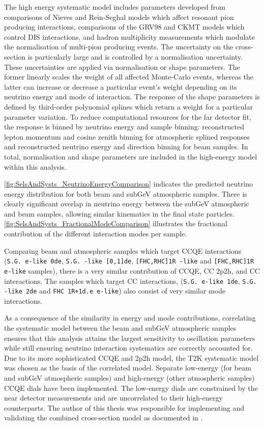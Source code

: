 The high energy systematic model includes parameters developed from comparisons of Nieves and Rein-Seghal models which affect resonant pion producing interactions, comparisons of the GRV98 and CKMT models which control DIS interactions, and hadron multiplicity measurements which modulate the normalisation of multi-pion producing events. The uncertainty on the \quickmath{\nu_{\tau}} cross-section is particularly large and is controlled by a  normalisation uncertainty. These uncertainties are applied via normalisation or shape parameters. The former linearly scales the weight of all affected Monte-Carlo events, whereas the latter can increase or decrease a particular event's weight depending on its neutrino energy and mode of interaction. The response of the shape parameters is defined by third-order polynomial splines which return a weight for a particular parameter variation. To reduce computational resources for the far detector fit, the response is binned by neutrino energy and sample binning: reconstructed lepton momentum and cosine zenith binning for atmospheric splined responses and reconstructed neutrino energy and direction binning for beam samples. In total,  normalisation and  shape parameters are included in the high-energy model within this analysis.

\autoref{fig:SelsAndSysts_NeutrinoEnergyComparison} indicates the predicted neutrino energy distribution for both beam and subGeV atmospheric samples. There is clearly significant overlap in neutrino energy between the subGeV atmospheric and beam samples, allowing similar kinematics in the final state particles. \autoref{fig:SelsAndSysts_FractionalModeComparison} illustrates the fractional contribution of the different interaction modes per sample.

Comparing beam and atmospheric samples which target CCQE interactions (\texttt{S.G. e-like 0de}, \texttt{S.G. \quickmath{\mu}-like [0,1]de}, \texttt{[FHC,RHC]1R \quickmath{\mu}-like} and \texttt{[FHC,RHC]1R e-like} samples), there is a very similar contribution of CCQE, CC 2p2h, and CC\quickmath{1\pi^{\pm}} interactions. The samples which target CC\quickmath{1\pi^{\pm}} interactions, (\texttt{S.G. e-like 1de}, \texttt{S.G. \quickmath{\mu}-like 2de} and \texttt{FHC 1R+1d.e e-like}) also consist of very similar mode interactions.

As a consequence of the similarity in energy and mode contributions, correlating the systematic model between the beam and subGeV atmospheric samples ensures that this analysis attains the largest sensitivity to oscillation parameters while still ensuring neutrino interaction systematics are correctly accounted for. Due to its more sophisticated CCQE and 2p2h model, the T2K systematic model was chosen as the basis of the correlated model. Separate low-energy (for beam and subGeV atmospheric samples) and high-energy (other atmospheric samples) CCQE dials have been implemented. The low-energy dials are constrained by the near detector measurements and are uncorrelated to their high-energy counterparts. The author of this thesis was responsible for implementing and validating the combined cross-section model as documented in \cite{t2k_tn_422, t2k_tn_426}.

